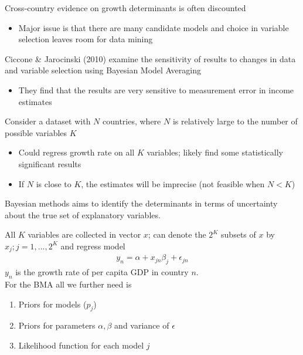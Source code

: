 \documentclass{beamer}
\begin{document}
\begin{frame}
  Cross-country evidence on growth determinants is often discounted
  \begin{itemize}
    \item Major issue is that there are many candidate models and choice in variable selection leaves room for data mining
  \end{itemize}
  \medskip
  Ciccone \& Jarocinski (2010) examine the sensitivity of results to changes in data and variable selection using Bayesian Model Averaging
  \begin{itemize}
    \item They find that the results are very sensitive to measurement error in income estimates
  \end{itemize}  
\end{frame}

\begin{frame}
  Consider a dataset with $N$ countries, where $N$ is relatively large to the number of possible variables $K$
  \begin{itemize}
    \item Could regress growth rate on all $K$ variables; likely find some statistically significant results
    \item If $N$ is close to $K$, the estimates will be imprecise (not feasible when $N<K$)
  \end{itemize}
  \medskip
  Bayesian methods aims to identify the determinants in terms of uncertainty about the true set of explanatory variables. 
\end{frame}

\begin{frame}
  All $K$ variables are collected in vector $x$; can denote the $2^K$ subsets of $x$ by $x_j; j=1,...,2^K$ and regress model
  \begin{align}
    y_n=\alpha +x_{jn}\beta_j + \epsilon_{jn}
  \end{align}
  $y_n$ is the growth rate of per capita GDP in country $n$. \\
  For the BMA all we further need is 
  \begin{enumerate}
    \item Priors for models ($p_j$)
    \item Priors for parameters $\alpha,\beta$ and variance of $\epsilon$
    \item Likelihood function for each model $j$
  \end{enumerate}
\end{frame}
\end{document}
